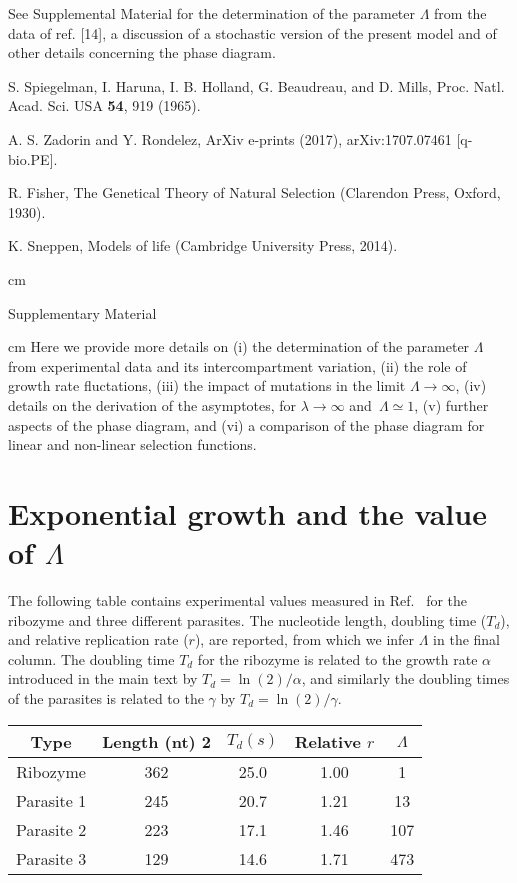 \documentclass[twocolumn,showpacs,floatfix]{revtex4-1}
\begin{document}
\begin{thebibliography}{99}
 See Supplemental Material for the determination
of the parameter $\Lambda$ from the data of ref. [14], a
discussion of a stochastic version of the present
model and of other details concerning the phase
diagram.

 S. Spiegelman, I. Haruna, I. B. Holland, G. Beaudreau,
and D. Mills, Proc. Natl. Acad. Sci. USA {\bf 54}, 919
(1965).

 A. S. Zadorin and Y. Rondelez, ArXiv e-prints
(2017), arXiv:1707.07461 [q-bio.PE].

 R. Fisher, The Genetical Theory of Natural Selection (Clarendon Press, Oxford, 1930).

 K. Sneppen, Models of life (Cambridge University Press, 2014).

\begin{widetext}

 cm

\centerline{\Large \sf Supplementary Material}
 cm
Here we provide more details on (i) the determination of the parameter $\Lambda$ from experimental data and its intercompartment variation, 
(ii) the role of growth rate fluctations, (iii)
the impact of mutations in the limit $\Lambda \to \infty$, (iv) details on the derivation of the asymptotes, 
for $\lambda\to\infty$ and~$\Lambda\simeq 1$, (v) further aspects of the phase diagram, 
and (vi) a comparison of the phase diagram for linear and non-linear selection functions. 

\section{Exponential growth and the value of $\Lambda$}
The following table contains experimental values measured in Ref.~\cite{Matsumura2016} for the ribozyme and three different parasites. The nucleotide
length, doubling time ($T_d$), and relative replication rate ($r$), are reported, from which we infer 
$\Lambda$ in the final column. The doubling time $T_d$ for the ribozyme 
is related to the growth rate $\alpha$ introduced in the main text by $T_d=\ln(2)/\alpha$, and similarly
the doubling times of the parasites is related to the $\gamma$ by $T_d=\ln(2)/\gamma$.

\begin{center}
\begin{tabular}{|c|c|c|c|c|}
  \hline
  Type  & Length (nt) 2 & $T_{d} (s)$ &  Relative $r$ & $\Lambda$ \\
  \hline
  Ribozyme & 362 & 25.0 &  1.00 & 1\\
  Parasite 1 & 245 & 20.7 &  1.21 & 13\\
  Parasite 2 & 223 & 17.1 &  1.46 & 107\\
  Parasite 3 & 129 & 14.6 &  1.71 & 473 \\
  \hline
\end{tabular}
\end{center}



\end{widetext}
\end{thebibliography}
\end{document}
